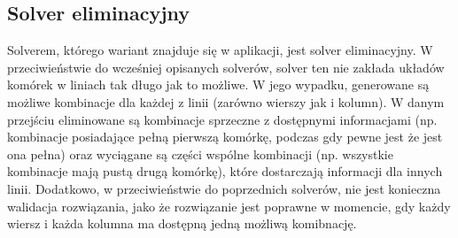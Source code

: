 \subsection{Solver eliminacyjny}
    Solverem, którego wariant znajduje się w aplikacji, jest solver eliminacyjny. W przeciwieństwie
do wcześniej opisanych solverów, solver ten nie zakłada układów komórek w liniach tak długo jak to
możliwe. W jego wypadku, generowane są możliwe kombinacje dla każdej z linii (zarówno wierszy jak i
kolumn). W danym przejściu eliminowane są kombinacje sprzeczne z dostępnymi informacjami 
(np. kombinacje posiadające pełną pierwszą komórkę, podczas gdy pewne jest że jest ona pełna) 
oraz wyciągane są części wspólne kombinacji (np. wszystkie kombinacje mają pustą drugą komórkę), 
które dostarczają informacji dla innych linii. Dodatkowo, w przeciwieństwie do poprzednich solverów,
nie jest konieczna walidacja rozwiązania, jako że rozwiązanie jest poprawne w momencie, gdy każdy
wiersz i każda kolumna ma dostępną jedną możliwą komibnację.

